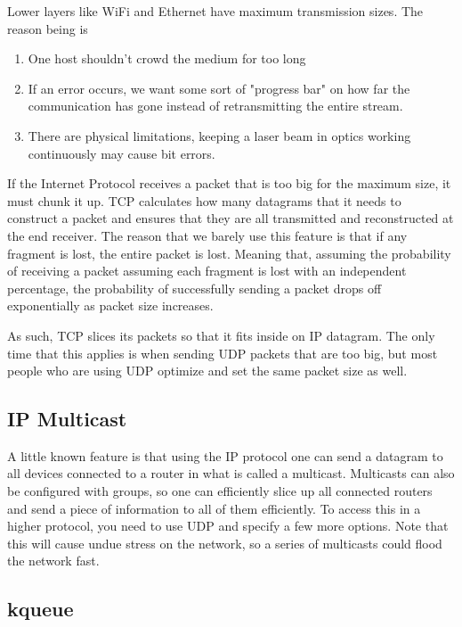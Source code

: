 Lower layers like WiFi and Ethernet have maximum transmission sizes.
The reason being is

\begin{enumerate}
  \item One host shouldn't crowd the medium for too long
  \item If an error occurs, we want some sort of "progress bar" on how far the communication has gone instead of retransmitting the entire stream.
  \item There are physical limitations, keeping a laser beam in optics working continuously may cause bit errors.
\end{enumerate}

If the Internet Protocol receives a packet that is too big for the maximum size, it must chunk it up.
TCP calculates how many datagrams that it needs to construct a packet and ensures that they are all transmitted and reconstructed at the end receiver.
The reason that we barely use this feature is that if any fragment is lost, the entire packet is lost.
Meaning that, assuming the probability of receiving a packet assuming each fragment is lost with an independent percentage, the probability of successfully sending a packet drops off exponentially as packet size increases.

As such, TCP slices its packets so that it fits inside on IP datagram.
The only time that this applies is when sending UDP packets that are too big, but most people who are using UDP optimize and set the same packet size as well.

\subsection{IP Multicast}

A little known feature is that using the IP protocol one can send a datagram to all devices connected to a router in what is called a multicast.
Multicasts can also be configured with groups, so one can efficiently slice up all connected routers and send a piece of information to all of them efficiently.
To access this in a higher protocol, you need to use UDP and specify a few more options.
Note that this will cause undue stress on the network, so a series of multicasts could flood the network fast.


\subsection{kqueue}

